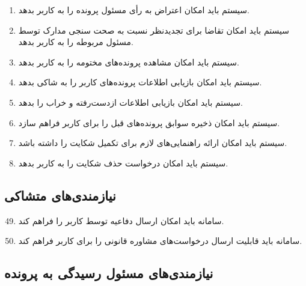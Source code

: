\documentclass[12pt,a4paper,oneside]{article}
\begin{document}
\begin{enumerate}[label=.R\arabic*]
		\item سیستم باید امکان اعتراض به رأی مسئول پرونده را به کاربر بدهد.
		\item سیستم باید امکان تقاضا برای تجدیدنظر نسبت به صحت سنجی مدارک توسط مسئول مربوطه را به کاربر بدهد.
		\item سیستم باید امکان مشاهده پرونده‌های مختومه را به کاربر بدهد.
		\item سیستم باید امکان بازیابی اطلاعات پرونده‌های کاربر را به شاکی بدهد.
		\item سیستم باید امکان بازیابی اطلاعات ازدست‌رفته و خراب را بدهد.
		\item سیستم باید امکان ذخیره سوابق پرونده‌های قبل را برای کاربر فراهم سازد.
		\item سیستم باید امکان ارائه راهنمایی‌های لازم برای تکمیل شکایت را داشته باشد.
		\item سیستم باید امکان درخواست حذف شکایت را به کاربر بدهد.
	\end{enumerate}
	
	\subsection*{نیازمندی‌های متشاکی}
	
	\begin{enumerate}[label=.R\arabic*]
		\setcounter{enumi}{48}
		\item سامانه باید امکان ارسال دفاعیه توسط کاربر را فراهم کند.
		\item سامانه باید قابلیت ارسال درخواست‌های مشاوره قانونی را برای کاربر فراهم کند.
	\end{enumerate}
	
	\subsection*{نیازمندی‌های مسئول رسیدگی به پرونده}
	
\end{document}
